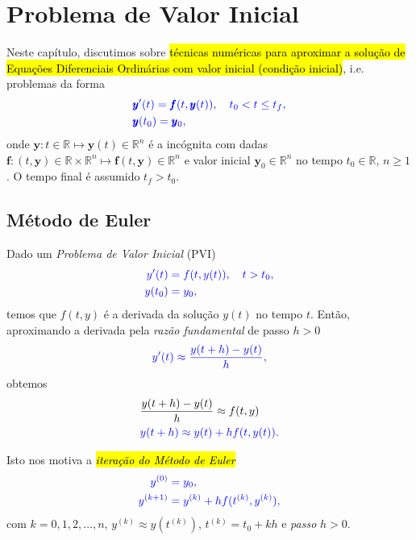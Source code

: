 \chapter{Problema de Valor Inicial}\label{cap_pvi}

Neste capítulo, discutimos sobre \hl{técnicas numéricas para aproximar a solução de Equações Diferenciais Ordinárias com valor inicial (condição inicial)}, i.e. problemas da forma
\begin{align}
  &\color{blue}\pmb{y}'(t) = \pmb{f}(t,\pmb{y}(t)),\quad t_0 < t \leq t_f,\\
  &\color{blue}\pmb{y}(t_0) = \pmb{y}_0,
\end{align}
onde $\pmb{y}:t\in\mathbb{R}\mapsto\pmb{y}(t)\in\mathbb{R}^n$ é a incógnita com dadas $\pmb{f}:(t,\pmb{y})\in\mathbb{R}\times\mathbb{R}^n\mapsto\pmb{f}(t,\pmb{y})\in\mathbb{R}^n$ e valor inicial  $\pmb{y}_0\in\mathbb{R}^n$ no tempo $t_0\in\mathbb{R}$, $n\geq 1$. O tempo final é assumido $t_f > t_0$.

\section{Método de Euler}\label{cap_pvi_sec_euler}

Dado um \emph{Problema de Valor Inicial} (PVI)
\begin{subequations}\label{cap_pvi_sec_euler:eq:pvi}\hleq
  \begin{align}
    y'(t) &= f(t,y(t)),\quad t>t_0,\\
    y(t_0) &= y_0,
  \end{align}
\end{subequations}
temos que $f(t,y)$ é a derivada da solução $y(t)$ no tempo $t$. Então, aproximando a derivada pela \emph{razão fundamental} de passo $h>0$
\begin{equation}\color{blue}y'(t) \approx \frac{y(t+h)-y(t)}{h},
\end{equation}
obtemos
\begin{align}
  &\frac{y(t+h)-y(t)}{h} \approx f(t,y) \\
  &\color{blue}y(t+h) \approx y(t) + hf(t,y(t)).\label{cap_pvi_sec_euler:eq:euler_aux1}
\end{align}

Isto nos motiva a \hl{\emph{iteração do Método de Euler}}{\euler}
\begin{subequations}\hleq
  \begin{align}
    y^{(0)} &= y_0,\\
    y^{(k+1)} &= y^{(k)} + hf(t^{(k)},y^{(k)}),
  \end{align}
\end{subequations}
com $k=0, 1, 2, \dotsc, n$, $y^{(k)}\approx y\left(t^{(k)}\right)$, $t^{(k)} = t_0 + kh$ e \emph{passo} $h>0$.

